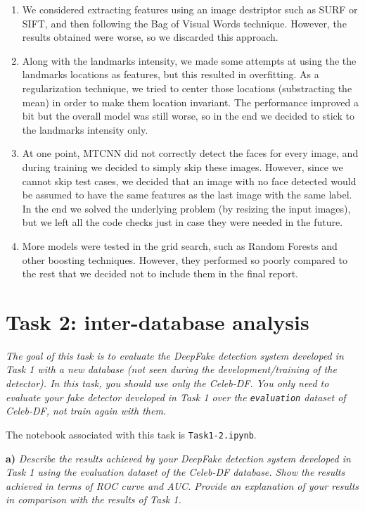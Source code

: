 \documentclass[11pt]{article}
\begin{document}
\begin{enumerate}
  \item We considered extracting features using an image destriptor such as SURF or SIFT, and then following the Bag of Visual Words technique. However, the results obtained were worse, so we discarded this approach.
  \item Along with the landmarks intensity, we made some attempts at using the the landmarks locations as features, but this resulted in overfitting. As a regularization technique, we tried to center those locations (substracting the mean) in order to make them location invariant. The performance improved a bit but the overall model was still worse, so in the end we decided to stick to the landmarks intensity only.
  \item At one point, MTCNN did not correctly detect the faces for every image, and during training we decided to simply skip these images. However, since we cannot skip test cases, we decided that an image with no face detected would be assumed to have the same features as the last image with the same label. In the end we solved the underlying problem (by resizing the input images), but we left all the code checks just in case they were needed in the future.
  \item More models were tested in the grid search, such as Random Forests and other boosting techniques. However, they performed so poorly compared to the rest that we decided not to include them in the final report.
\end{enumerate}

\section*{Task 2: inter-database analysis}

\textit{The goal of this task is to evaluate the DeepFake detection system developed in Task 1 with a new database (not seen during the development/training of the detector). In this task, you should use only the Celeb-DF. You only need to evaluate your fake detector developed in Task 1 over the \texttt{evaluation} dataset of Celeb-DF, not train again with them.}

The notebook associated with this task is \texttt{Task1-2.ipynb}.

\textbf{a)} \textit{Describe the results achieved by your DeepFake detection system developed in Task 1 using the evaluation dataset of the Celeb-DF database. Show the results achieved in terms of ROC curve and AUC. Provide an explanation of your results in comparison with the results of Task 1.}
\end{document}
